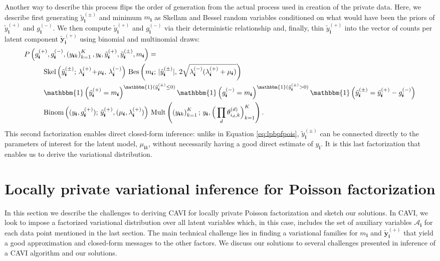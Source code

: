 \documentclass{article}
\newcommand{\subs}{\pmb{i}}
\newcommand{\wsup}[2]{#1_{\subs}^{(#2)}}
\newcommand{\ytP}{\wsup{\tilde{y}}{+}}
\newcommand{\ytPM}{\wsup{\tilde{y}}{\pm}}
\newcommand{\ysk}{y_{\subs k}}
\newcommand{\ys}{y_{\subs}}
\newcommand{\lamP}{\wsup{\lambda}{+}}
\newcommand{\lamM}{\wsup{\lambda}{-}}
\newcommand{\gP}{\wsup{g}{+}}
\newcommand{\gM}{\wsup{g}{-}}
\newcommand{\musk}{\mu_{\subs k}}
\newcommand{\ms}{m_{\subs}}
\newcommand{\yvtP}{\boldsymbol{\tilde{y}}_{\subs}^{(+)}}
\newcommand{\tp}{\!+\!}
\begin{document}
Another way to describe this process flips the order of generation from the
actual process used in creation of the private data. Here, we describe first
generating $\ytPM$ and minimum $\ms$ as Skellam and Bessel random variables
conditioned on what would have been the priors of $\ytP$ and $\gM$. We then
compute $\ytP$ and $\gM$ via their deterministic relationship and, finally, thin
$\ytP$ into the vector of counts per latent component $\yvtP$ using binomial and
multinomial draws:
\begin{align}
    P &\left(\gP, \gM, \left(\ysk\right)_{k=1}^K, \ys,
    \ytP, \ytPM, \ms\right) = \notag \\
  &\quad\quad \text{Skel}\left(\ytPM;\, \lamP \tp \mu_{\subs},\, \lamM\right)\, \text{Bes}\left(\ms;\, |\ytPM|,\,2\sqrt{\lamM(\lamP+\mu_{\subs})}\right)\notag\\
  &\quad\quad \mathbbm{1} \left(\ytP=\ms\right)^{\mathbbm{1}(\ytPM \leq 0)} \mathbbm{1} \left(\gM=\ms\right)^{\mathbbm{1}(\ytPM > 0)} \mathbbm{1}\left(\ytPM = \ytP - \gM\right)\notag\\
  &\quad\quad \text{Binom}\left((\ys, \gP);\, \ytP, (\mu_{\subs}, \lamP)\right) \,  \text{Mult}\left(\left(\ysk\right)_{k=1}^K;\, \ys, \Big( \prod_d \theta_{i_d,k}^{(d)} \Big)_{k=1}^K\right).
\label{eqn:finalfact}
\end{align}
This second factorization enables direct closed-form inference: unlike in
  Equation \ref{eq:lpbpfpois}, $\ytPM$ can be connected directly to the
  parameters of interest for the latent model, $\musk$, without necessarily
  having a good direct estimate of $\ys$. It is this last factorization that
  enables us to derive the variational distribution.

  
  \section{Locally private variational inference for Poisson factorization}
  In this section we describe the challenges to deriving CAVI for locally
  private Poisson factorization and sketch our solutions. In CAVI, we look to
  impose a factorized variational distribution over all latent variables which,
  in this case, includes the set of auxiliary variables $\mathcal{A}_{\subs}$
  for each data point mentioned in the last section. The main technical
  challenge lies in finding a variational families for $\ms$ and $\yvtP$ that
  yield a good approximation and closed-form messages to the other factors. We
  discuss our solutions to several challenges presented in inference of a CAVI
  algorithm and our solutions.~
   
\end{document}
